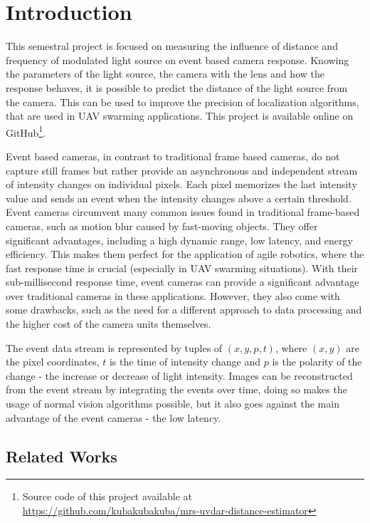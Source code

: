 
\chapter{Introduction\label{chap:introduction}}

This semestral project is focused on measuring the influence of distance and frequency of modulated
light source on event based camera response. Knowing the parameters of the light source, the camera with the lens
and how the response behaves, it is possible to predict the distance of the light source from the camera. This can be
used to improve the precision of localization algorithms, that are used in \ac{UAV} swarming applications.
This project is available online on GitHub\footnote{Source code of this project available at \url{https://github.com/kubakubakuba/mrs-uvdar-distance-estimator}}.

Event based cameras, in contrast to traditional frame based cameras, do not capture still frames but rather
provide an asynchronous and independent stream of intensity changes on individual pixels.
Each pixel memorizes the last intensity value and sends an event when the intensity changes above a certain threshold.
Event cameras circumvent many common issues found in traditional frame-based cameras, such as motion blur caused
by fast-moving objects. They offer significant advantages, including a high dynamic range, low latency,
and energy efficiency.
This makes them perfect for the application of agile robotics,
where the fast response time is crucial (especially in UAV swarming situations). With their sub-millisecond response time,
event cameras can provide a significant advantage over traditional cameras in these applications.
However, they also come with some drawbacks, such as the need for a different approach to
data processing and the higher cost of the camera units themselves. \cite{gallego2020event}

The event data stream is represented by tuples of $(x, y, p, t)$, where $(x, y)$ are the pixel coordinates, $t$ is the time of
intensity change and $p$ is the polarity of the change - the increase or decrease of light intensity. Images can be
reconstructed from the event stream by integrating the events over time, doing so makes the usage of normal vision 
algorithms possible, but it also goes against the main advantage of the event cameras - the low latency.

\section{Related Works}

